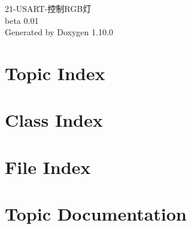 \documentclass[twoside]{book}
\newcommand{\+}{\discretionary{\mbox{\scriptsize$\hookleftarrow$}}{}{}}
\newcommand{\clearemptydoublepage}{%
    \newpage{\pagestyle{empty}\cleardoublepage}%
  }
\begin{document}
  \raggedbottom
    \hypersetup{pageanchor=false,
                bookmarksnumbered=true,
                pdfencoding=unicode
               }
  \begin{titlepage}
  \vspace*{7cm}
  \begin{center}%
  {\Large 21-\/\+USART-\/控制\+RGB灯}\\
  [1ex]\large beta 0.\+01 \\
  \vspace*{1cm}
  {\large Generated by Doxygen 1.10.0}\\
  \end{center}
  \end{titlepage}
  \clearemptydoublepage
  \tableofcontents
  \clearemptydoublepage
  \hypersetup{pageanchor=true}
\chapter{Topic Index}

\chapter{Class Index}

\chapter{File Index}

\chapter{Topic Documentation}





\end{document}
